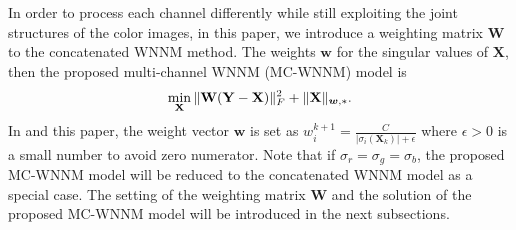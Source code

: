 \documentclass[10pt,twocolumn,letterpaper,sort&compress]{article}
\begin{document}
In order to process each channel differently while still exploiting the joint structures of the color images, in this paper, we introduce a weighting matrix $\mathbf{W}$ to the concatenated WNNM method. The weights $\bm{w}$ for the singular values of $\mathbf{X}$, then the proposed multi-channel WNNM (MC-WNNM) model is
\vspace{-1mm}
\begin{equation}
\label{e4}
\vspace{-1mm}
\min_{\mathbf{X}}\|\mathbf{W}(\mathbf{Y}-\mathbf{X})\|_{F}^{2}
+ 
\|\mathbf{X}\|_{\bm{w},*}.
\end{equation}
In \cite{wnnmijcv} and this paper, the weight vector $\bm{w}$ is set as $w_{i}^{k+1}=\frac{C}{|\sigma_{i}(\mathbf{X}_{k})|+\epsilon }$ where $\epsilon>0$ is a small number to avoid zero numerator. Note that if $\sigma_{r}=\sigma_{g}=\sigma_{b}$, the proposed MC-WNNM model will be reduced to the concatenated WNNM model as a special case.
The setting of the weighting matrix $\mathbf{W}$ and the solution of the proposed MC-WNNM model will be introduced in the next subsections.
\end{document}
